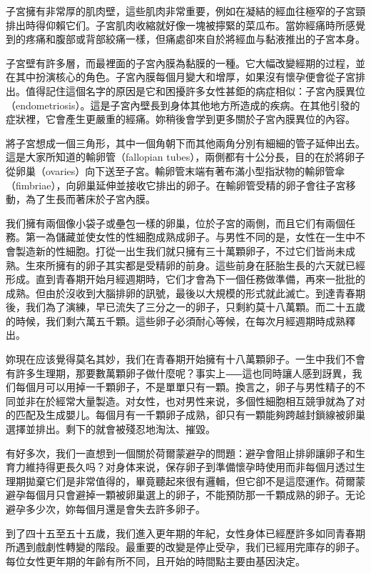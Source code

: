 \documentclass[12pt,UTF8]{ctexbook}
\begin{document}
子宮擁有非常厚的肌肉壁，這些肌肉非常重要，例如在凝結的經血往極窄的子宮頸排出時得仰賴它们。子宮肌肉收縮就好像一塊被擰緊的菜瓜布。當妳經痛時所感覺到的疼痛和腹部或背部絞痛一樣，但痛處卻來自於將經血与黏液推出的子宮本身。

子宮壁有許多層，而最裡面的子宮內膜為黏膜的一種。它大幅改變經期的过程，並在其中扮演核心的角色。子宮內膜每個月變大和增厚，如果沒有懷孕便會從子宮排出。值得記住這個名字的原因是它和困擾許多女性甚鉅的病症相似：子宮內膜異位（endometriosis）。這是子宮內壁長到身体其他地方所造成的疾病。在其他引發的症狀裡，它會產生更嚴重的經痛。妳稍後會学到更多關於子宮內膜異位的內容。

將子宮想成一個三角形，其中一個角朝下而其他兩角分別有細細的管子延伸出去。這是大家所知道的輸卵管（fallopian tubes），兩側都有十公分長，目的在於將卵子從卵巢（ovaries）向下送至子宮。輸卵管末端有著布滿小型指狀物的輸卵管傘（fimbriae），向卵巢延伸並接收它排出的卵子。在輸卵管受精的卵子會往子宮移動，為了生長而著床於子宮內膜。

我们擁有兩個像小袋子或壘包一樣的卵巢，位於子宮的兩側，而且它们有兩個任務。第一為儲藏並使女性的性細胞成熟成卵子。与男性不同的是，女性在一生中不會製造新的性細胞。打從一出生我们就只擁有三十萬顆卵子，不过它们皆尚未成熟。生來所擁有的卵子其实都是受精卵的前身。這些前身在胚胎生長的六天就已經形成。直到青春期开始月經週期時，它们才會為下一個任務做準備，再來一批批的成熟。但由於沒收到大腦排卵的訊號，最後以大規模的形式就此滅亡。到達青春期後，我们為了演練，早已流失了三分之一的卵子，只剩約莫十八萬顆。而二十五歲的時候，我们剩六萬五千顆。這些卵子必須耐心等候，在每次月經週期時成熟釋出。

妳現在应该覺得莫名其妙，我们在青春期开始擁有十八萬顆卵子。一生中我们不會有許多生理期，那要數萬顆卵子做什麼呢？事实上⸺這也同時讓人感到訝異，我们每個月可以用掉一千顆卵子，不是單單只有一顆。換言之，卵子与男性精子的不同並非在於經常大量製造。对女性，也对男性来说，多個性細胞相互競爭就為了对的匹配及生成嬰儿。每個月有一千顆卵子成熟，卻只有一顆能夠跨越封鎖線被卵巢選擇並排出。剩下的就會被殘忍地淘汰、摧毀。

有好多次，我们一直想到一個關於荷爾蒙避孕的問題：避孕會阻止排卵讓卵子和生育力維持得更長久吗？对身体来说，保存卵子到準備懷孕時使用而非每個月透过生理期拋棄它们是非常值得的，畢竟聽起來很有邏輯，但它卻不是這麼運作。荷爾蒙避孕每個月只會避掉一顆被卵巢選上的卵子，不能預防那一千顆成熟的卵子。无论避孕多少次，妳每個月還是會失去許多卵子。

到了四十五至五十五歲，我们進入更年期的年紀，女性身体已經歷許多如同青春期所遇到戲劇性轉變的階段。最重要的改變是停止受孕，我们已經用完庫存的卵子。每位女性更年期的年齡有所不同，且开始的時間點主要由基因決定。
\end{document}
